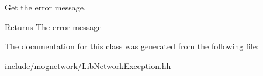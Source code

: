 Get the error message. 

\begin{DoxyReturn}{Returns}
The error message 
\end{DoxyReturn}


The documentation for this class was generated from the following file\-:\begin{DoxyCompactItemize}
\item 
include/mognetwork/\hyperlink{_lib_network_exception_8hh}{Lib\-Network\-Exception.\-hh}\end{DoxyCompactItemize}
